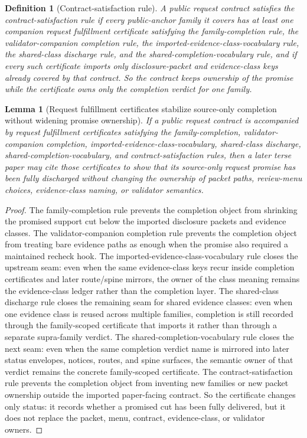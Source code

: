 \documentclass[11pt]{article}
\newtheorem{definition}{Definition}
\newtheorem{lemma}{Lemma}
\begin{document}
\begin{definition}[Contract-satisfaction rule]
A public request contract satisfies the \emph{contract-satisfaction rule} if every public-anchor family it covers has at least one companion request fulfillment certificate satisfying the family-completion rule, the validator-companion completion rule, the imported-evidence-class-vocabulary rule, the shared-class discharge rule, and the shared-completion-vocabulary rule, and if every such certificate imports only disclosure-packet and evidence-class keys already covered by that contract.
So the contract keeps ownership of the promise while the certificate owns only the completion verdict for one family.
\end{definition}

\begin{lemma}[Request fulfillment certificates stabilize source-only completion without widening promise ownership]
If a public request contract is accompanied by request fulfillment certificates satisfying the family-completion, validator-companion completion, imported-evidence-class-vocabulary, shared-class discharge, shared-completion-vocabulary, and contract-satisfaction rules, then a later terse paper may cite those certificates to show that its source-only request promise has been fully discharged without changing the ownership of packet paths, review-menu choices, evidence-class naming, or validator semantics.
\end{lemma}

\begin{proof}
The family-completion rule prevents the completion object from shrinking the promised support cut below the imported disclosure packets and evidence classes.
The validator-companion completion rule prevents the completion object from treating bare evidence paths as enough when the promise also required a maintained recheck hook. The imported-evidence-class-vocabulary rule closes the upstream seam: even when the same evidence-class keys recur inside completion certificates and later route/spine mirrors, the owner of the class meaning remains the evidence-class ledger rather than the completion layer.
The shared-class discharge rule closes the remaining seam for shared evidence classes: even when one evidence class is reused across multiple families, completion is still recorded through the family-scoped certificate that imports it rather than through a separate supra-family verdict. The shared-completion-vocabulary rule closes the next seam: even when the same completion verdict name is mirrored into later status envelopes, notices, routes, and spine surfaces, the semantic owner of that verdict remains the concrete family-scoped certificate. The contract-satisfaction rule prevents the completion object from inventing new families or new packet ownership outside the imported paper-facing contract.
So the certificate changes only status: it records whether a promised cut has been fully delivered, but it does not replace the packet, menu, contract, evidence-class, or validator owners.\qedhere
\end{proof}
\end{document}

